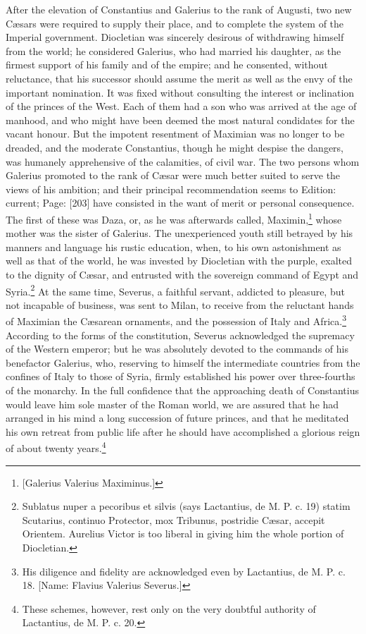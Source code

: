 After the elevation of Constantius and Galerius to the rank of Augusti, two new Cæsars were required to supply their place, and to complete the system of the Imperial government. Diocletian was sincerely desirous of withdrawing himself from the world; he considered Galerius, who had married his daughter, as the firmest support of his family and of the empire; and he consented, without reluctance, that his successor should assume the merit as well as the envy of the important nomination. It was fixed without consulting the interest or inclination of the princes of the West. Each of them had a son who was arrived at the age of manhood, and who might have been deemed the most natural condidates for the vacant honour. But the impotent resentment of Maximian was no longer to be dreaded, and the moderate Constantius, though he might despise the dangers, was humanely apprehensive of the calamities, of civil war. The two persons whom Galerius promoted to the rank of Cæsar were much better suited to serve the views of his ambition; and their principal recommendation seems to Edition: current; Page: [203] have consisted in the want of merit or personal consequence. The first of these was Daza, or, as he was afterwards called, Maximin,\footnote{[Galerius Valerius Maximinus.]} whose mother was the sister of Galerius. The unexperienced youth still betrayed by his manners and language his rustic education, when, to his own astonishment as well as that of the world, he was invested by Diocletian with the purple, exalted to the dignity of Cæsar, and entrusted with the sovereign command of Egypt and Syria.\footnote{Sublatus nuper a pecoribus et silvis (says Lactantius, de M. P. c. 19) statim Scutarius, continuo Protector, mox Tribunus, postridie Cæsar, accepit Orientem. Aurelius Victor is too liberal in giving him the whole portion of Diocletian.} At the same time, Severus, a faithful servant, addicted to pleasure, but not incapable of business, was sent to Milan, to receive from the reluctant hands of Maximian the Cæsarean ornaments, and the possession of Italy and Africa.\footnote{His diligence and fidelity are acknowledged even by Lactantius, de M. P. c. 18. [Name: Flavius Valerius Severus.]} According to the forms of the constitution, Severus acknowledged the supremacy of the Western emperor; but he was absolutely devoted to the commands of his benefactor Galerius, who, reserving to himself the intermediate countries from the confines of Italy to those of Syria, firmly established his power over three-fourths of the monarchy. In the full confidence that the approaching death of Constantius would leave him sole master of the Roman world, we are assured that he had arranged in his mind a long succession of future princes, and that he meditated his own retreat from public life after he should have accomplished a glorious reign of about twenty years.\footnote{These schemes, however, rest only on the very doubtful authority of Lactantius, de M. P. c. 20.}

